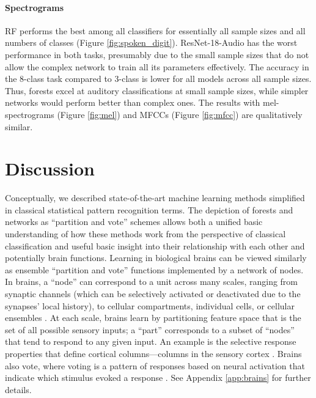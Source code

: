 \paragraph{Spectrograms}
RF performs the best among all classifiers for essentially all sample sizes and all numbers of classes (Figure \ref{fig:spoken_digit}). ResNet-18-Audio has the worst performance in both tasks, presumably due to the small sample sizes that do not allow the complex network to train all its parameters effectively.
The accuracy in the 8-class task compared to 3-class is lower for all models across all sample sizes. Thus, forests excel at auditory classifications at small sample sizes, while simpler networks would perform better than complex ones.
The results with mel-spectrograms (Figure \ref{fig:mel}) and MFCCs (Figure \ref{fig:mfcc}) are qualitatively similar.

\section{Discussion}
\label{Discussion}
Conceptually, we described state-of-the-art machine learning methods simplified in classical statistical pattern recognition terms. The depiction of forests and networks as ``partition and vote'' schemes allows both a unified basic understanding of how these methods work from the perspective of classical classification and useful basic insight into their relationship with each other and potentially brain functions. 
Learning in biological brains can be viewed similarly as ensemble ``partition and vote'' functions implemented by a network of nodes.
In brains, a ``node'' can correspond to a unit across many scales, ranging from synaptic channels (which can be selectively activated or deactivated due to the synapses' local history), to cellular compartments, individual cells, or cellular ensembles \citep{Vogelstein2019-om}.
At each scale, brains learn by partitioning feature space that is the set of all possible sensory inputs; a ``part'' corresponds to a subset of ``nodes'' that tend to respond to any given input.
An example is the selective response properties that define cortical columns---columns in the sensory cortex \citep{Mountcastle1997-by}.
Brains also vote, where voting is a pattern of responses based on neural activation that indicate which stimulus evoked a response \citep{Machens2005-wk}.
See Appendix \ref{app:brains} for further details.

